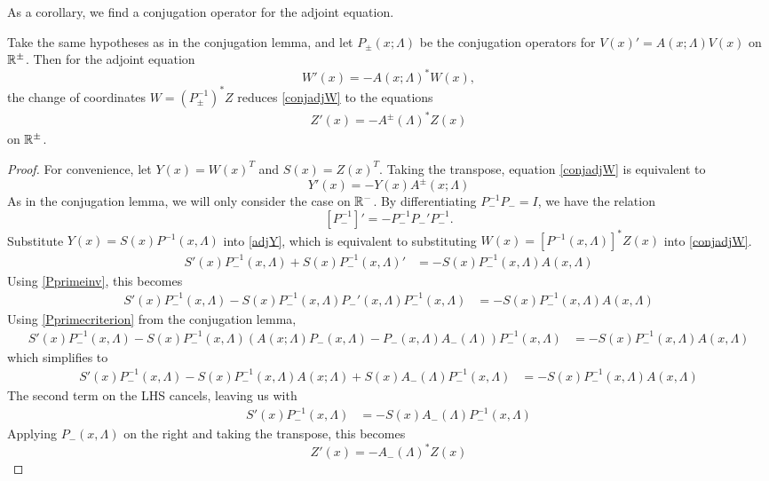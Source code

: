 \documentclass[thesis.tex]{subfiles}
\begin{document}
As a corollary, we find a conjugation operator for the adjoint equation.

\begin{corollary}\label{corr:adjconj}
Take the same hypotheses as in the conjugation lemma, and let $P_\pm(x; \Lambda)$ be the conjugation operators for $V(x)' = A(x; \Lambda) V(x)$ on $\mathbb{R}^\pm$. Then for the adjoint equation
\begin{equation}\label{conjadjW}
W'(x) = -A(x; \Lambda)^* W(x),
\end{equation}
the change of coordinates $W = (P_\pm^{-1})^* Z$ reduces \cref{conjadjW} to the equations
\begin{align}\label{ZconjW}
Z'(x) = -A^\pm(\Lambda)^* Z(x) 
\end{align}
on $\mathbb{R}^\pm$.
\begin{proof}
For convenience, let $Y(x) = W(x)^T$ and $S(x) = Z(x)^T$. Taking the transpose, equation \cref{conjadjW} is equivalent to
\begin{equation}\label{adjY}
Y'(x) = -Y(x)A^\pm(x; \Lambda) 
\end{equation}
As in the conjugation lemma, we will only consider the case on $\mathbb{R}^-$. By differentiating $P_-^{-1} P_- = I$, we have the relation
\begin{equation}\label{Pprimeinv}
[P_-^{-1}]' = -P_-^{-1} P_-' P_-^{-1}.
\end{equation}
Substitute $Y(x) = S(x) P^{-1}(x, \Lambda)$ into \cref{adjY}, which is equivalent to substituting $W(x) = [P^{-1}(x, \Lambda)]^* Z(x)$ into \cref{conjadjW}.
\begin{align*}
S'(x) P_-^{-1}(x, \Lambda) + S(x) P_-^{-1}(x, \Lambda)'
&= -S(x) P_-^{-1}(x, \Lambda) A(x, \Lambda)
\end{align*}
Using \cref{Pprimeinv}, this becomes
\begin{align*}
S'(x) P_-^{-1}(x, \Lambda) - S(x) P_-^{-1}(x, \Lambda) P_-'(x, \Lambda) P_-^{-1}(x, \Lambda)
&= -S(x) P_-^{-1}(x, \Lambda) A(x, \Lambda)
\end{align*}
Using \cref{Pprimecriterion} from the conjugation lemma, 
\begin{align*}
S'(x) P_-^{-1}(x, \Lambda) - S(x) P_-^{-1}(x, \Lambda) \left(A(x; \Lambda)P_-(x, \Lambda) - P_-(x, \Lambda) A_-(\Lambda)\right) P_-^{-1}(x, \Lambda)
&= -S(x) P_-^{-1}(x, \Lambda) A(x, \Lambda)
\end{align*}
which simplifies to
\begin{align*}
S'(x) P_-^{-1}(x, \Lambda) - S(x) P_-^{-1}(x, \Lambda) A(x; \Lambda) + S(x) A_-(\Lambda) P_-^{-1}(x, \Lambda)
&= -S(x) P_-^{-1}(x, \Lambda) A(x, \Lambda)
\end{align*}
The second term on the LHS cancels, leaving us with
\begin{align*}
S'(x) P_-^{-1}(x, \Lambda) &= -S(x) A_-(\Lambda) P_-^{-1}(x, \Lambda)
\end{align*}
Applying $P_-(x, \Lambda)$ on the right and taking the transpose, this becomes
\[
Z'(x) = -A_-(\Lambda)^* Z(x)
\]
\end{proof}
\end{corollary}
\end{document}

